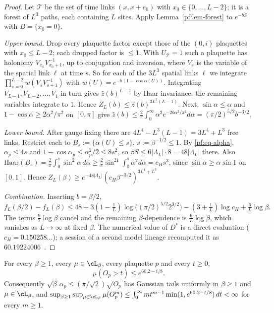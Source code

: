 \begin{proof}
Let $\mathcal T$ be the set of time links $(x,x+e_0)$ with $x_0\in\{0,\dots,L-2\}$; it is a forest of $L^3$ paths, each containing $L$ sites. Apply Lemma~\ref{pf:lem-forest} to $e^{-bS}$ with $B=\{x_0=0\}$.

\emph{Upper bound.} Drop every plaquette factor except those of the $(0,i)$ plaquettes with $x_0\le L-2$; each dropped factor is $\le1$. With $U_{\mathcal T}=1$ such a plaquette has holonomy $V_{x_0}V_{x_0+1}^{-1}$, up to conjugation and inversion, where $V_s$ is the variable of the spatial link $\ell$ at time $s$. So for each of the $3L^3$ spatial links $\ell$ we integrate $\prod_{s=0}^{L-2}w(V_sV_{s+1}^{-1})$ with $w(U)=e^{-b(1-\cos\alpha(U))}$. Integrating $V_{L-1},V_{L-2},\dots,V_1$ in turn gives $\hat z(b)^{L-1}$ by Haar invariance; the remaining variables integrate to $1$. Hence $Z_L(b)\le\hat z(b)^{3L^3(L-1)}$. Next, $\sin\alpha\le\alpha$ and $1-\cos\alpha\ge2\alpha^2/\pi^2$ on $[0,\pi]$ give
$\hat z(b)\le\frac2\pi\int_0^\infty\alpha^2e^{-2b\alpha^2/\pi^2}d\alpha=(\pi/2)^{5/2}b^{-3/2}$.

\emph{Lower bound.} After gauge fixing there are $4L^4-L^3(L-1)=3L^4+L^3$ free links. Restrict each to $B_s:=\{\alpha(U)\le s\}$, $s:=\beta^{-1/2}\le1$. By \eqref{pf:eq-alpha}, $\alpha_p\le4s$ and $1-\cos\alpha_p\le\alpha_p^2/2\le8s^2$, so $\beta S\le6|\Lambda_L|\cdot8=48|\Lambda_L|$ there. Also $\mathrm{Haar}(B_s)=\frac2\pi\int_0^s\sin^2\alpha\,d\alpha\ge\frac2\pi\sin^21\int_0^s\alpha^2d\alpha=c_Hs^3$, since $\sin\alpha\ge\alpha\sin1$ on $[0,1]$. Hence $Z_L(\beta)\ge e^{-48|\Lambda_L|}(c_H\beta^{-3/2})^{3L^4+L^3}$.

\emph{Combination.} Inserting $b=\beta/2$,
\[
f_L(\beta/2)-f_L(\beta)\le48+3(1-\tfrac1L)\log\big((\pi/2)^{5/2}2^{3/2}\big)-(3+\tfrac1L)\log c_H+\tfrac6L\log\beta .
\]
The terms $\tfrac92\log\beta$ cancel and the remaining $\beta$-dependence is $\tfrac6L\log\beta$, which vanishes as $L\to\infty$ at fixed $\beta$. The numerical value of $D^*$ is a direct evaluation ($c_H=0.150258\ldots$); a session of a second model lineage recomputed it as $60.19224006$~\cite[comment 7102590992]{RepoThread}.
\end{proof}

\begin{corollary}\label{pf:cor-tail}
For every $\beta\ge1$, every $\mu\in\cL_\beta$, every plaquette $p$ and every $t\ge0$,
\[
\mu(O_p>t)\le e^{60.2-t/8}.
\]
Consequently $\sqrt\beta\,\alpha_p\le(\pi/\sqrt2)\sqrt{O_p}$ has Gaussian tails uniformly in $\beta\ge1$ and $\mu\in\cL_\beta$, and $\sup_{\beta\ge1}\sup_{\mu\in\cL_\beta}\mu(O_p^m)\le\int_0^\infty mt^{m-1}\min(1,e^{60.2-t/8})\,dt<\infty$ for every $m\ge1$.
\end{corollary}

